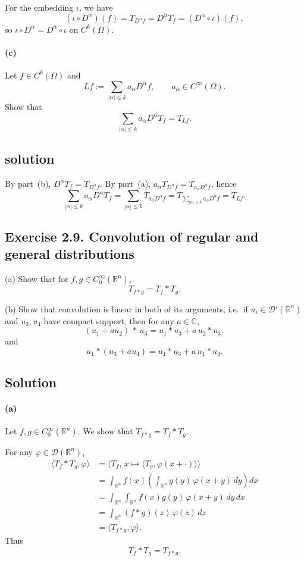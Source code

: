 \documentclass[12pt,a4paper]{article}
\theoremstyle{plain}
\theoremstyle{definition}
\theoremstyle{remark}
\theoremstyle{remark}
\begin{document}
	For the embedding $\iota$, we have
	\[
	(\iota\circ D^\alpha)(f) = T_{D^\alpha f}
	= D^\alpha T_f = (D^\alpha\circ\iota)(f),
	\]
	so $\iota\circ D^\alpha = D^\alpha\circ\iota$ on $C^k(\Omega)$.


\paragraph{(c)}
Let $f\in C^k(\Omega)$ and
\[
Lf := \sum_{|\alpha|\le k} a_\alpha D^\alpha f,
\qquad a_\alpha\in C^\infty(\Omega).
\]
Show that
\[
\sum_{|\alpha|\le k} a_\alpha D^\alpha T_f = T_{Lf}.
\]

\subsection*{solution}
	By part~(b), $D^\alpha T_f = T_{D^\alpha f}$. By part~(a),
	$a_\alpha T_{D^\alpha f} = T_{a_\alpha D^\alpha f}$, hence
	\[
	\sum_{|\alpha|\le k} a_\alpha D^\alpha T_f
	= \sum_{|\alpha|\le k} T_{a_\alpha D^\alpha f}
	= T_{\sum_{|\alpha|\le k} a_\alpha D^\alpha f}
	= T_{Lf}.
	\]


\subsection*{Exercise 2.9. Convolution of regular and general distributions}

\noindent
(a)\; Show that for $f,g\in C_0^\infty(\mathbb{R}^n)$,
\[
T_{f*g} = T_f * T_g .
\]

\medskip
\noindent
(b)\; Show that convolution is linear in both of its arguments, i.e.\ if
$u_i\in\mathcal{D}'(\mathbb{R}^n)$ and $u_3,u_4$ have compact support, then
for any $a\in\mathbb{C}$,
\[
(u_1 + a u_2)\,*\,u_3 = u_1*u_3 + a\,u_2*u_3,
\]
and
\[
u_1 * (u_3 + a u_4) = u_1*u_3 + a\,u_1*u_4.
\]

\subsection*{Solution}

\paragraph{(a)}
Let $f,g \in C_0^\infty(\mathbb{R}^n)$.  
We show that $T_{f*g} = T_f * T_g$.

For any $\varphi \in \mathcal{D}(\mathbb{R}^n)$,
\[
\begin{aligned}
	\langle T_f * T_g , \varphi \rangle
	&= \Big\langle T_f,\, x \mapsto \langle T_g , \varphi(x + \cdot)\rangle \Big\rangle \\[2mm]
	&= \int_{\mathbb{R}^n} f(x)
	\left( \int_{\mathbb{R}^n} g(y)\,\varphi(x+y)\,dy \right) dx \\[1mm]
	&= \int_{\mathbb{R}^n} \int_{\mathbb{R}^n}
	f(x)g(y)\,\varphi(x+y)\,dy\,dx \\[1mm]
	&= \int_{\mathbb{R}^n} (f*g)(z)\,\varphi(z)\,dz \\[1mm]
	&= \langle T_{f*g}, \varphi \rangle .
\end{aligned}
\]
Thus
\[
T_f * T_g = T_{f*g}.
\]
\end{document}
